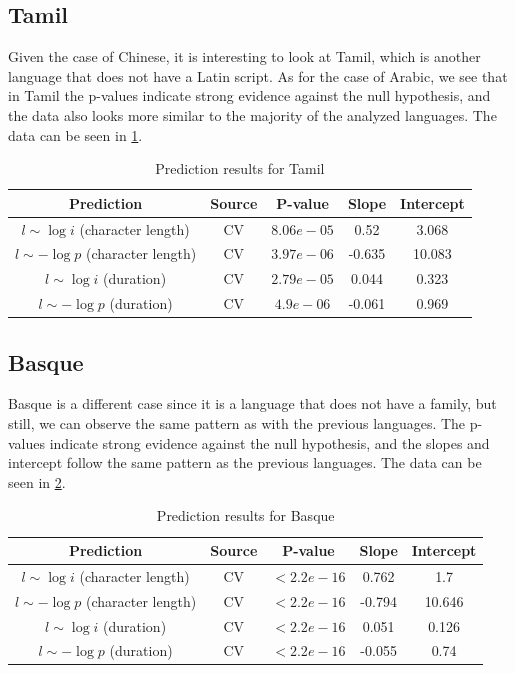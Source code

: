 \subsection{Tamil}

Given the case of Chinese, it is interesting to look at Tamil, which is another language that does not have a Latin script. As for the case of Arabic, we see that in Tamil the p-values indicate strong evidence against the null hypothesis, and the data also looks more similar to the majority of the analyzed languages. The data can be seen in \cref{tab:tamilresults}.

\begin{table}[H]
    \centering
    \begin{tabular}{c|c|c|c|c}
        Prediction & Source & P-value & Slope & Intercept \\ \hline
        $l \sim \log i$ (character length) & CV & $8.06e-05$ & 0.52 & 3.068 \\
        $l \sim -\log p$ (character length) & CV & $3.97e-06$ & -0.635 & 10.083 \\
        $l \sim \log i$ (duration) & CV & $2.79e-05$ & 0.044 & 0.323 \\
        $l \sim -\log p$ (duration) & CV & $4.9e-06$ & -0.061 & 0.969 \\
    \end{tabular}
    \caption{Prediction results for Tamil}
    \label{tab:tamilresults}
\end{table}

\subsection{Basque}

Basque is a different case since it is a language that does not have a family, but still, we can observe the same pattern as with the previous languages. The p-values indicate strong evidence against the null hypothesis, and the slopes and intercept follow the same pattern as the previous languages. The data can be seen in \cref{tab:basqueresults}.

\begin{table}[H]
    \centering
    \begin{tabular}{c|c|c|c|c}
        Prediction & Source & P-value & Slope & Intercept \\ \hline
        $l \sim \log i$ (character length) & CV & $<2.2e-16$ & 0.762 & 1.7 \\
        $l \sim -\log p$ (character length) & CV & $<2.2e-16$ & -0.794 & 10.646 \\
        $l \sim \log i$ (duration) & CV & $<2.2e-16$ & 0.051 & 0.126 \\
        $l \sim -\log p$ (duration) & CV & $<2.2e-16$ & -0.055 & 0.74 \\
    \end{tabular}
    \caption{Prediction results for Basque}
    \label{tab:basqueresults}
\end{table}

